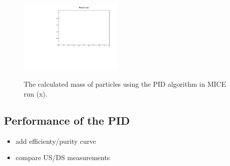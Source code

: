 \begin{figure}
{\centering\includegraphics[width=0.45\textwidth]{07-PID/plots/placeholder.pdf}}
\caption{The calculated mass of particles using the PID algorithm in MICE run (x).}
\label{fig:pid_mass}
\end{figure}


\subsection{Performance of the PID}
\label{SubSect:PID_Performance}
{\color{red}
\begin{itemize}
\item add efficienty/purity curve
\item compare US/DS measurements
\end{itemize}
}

